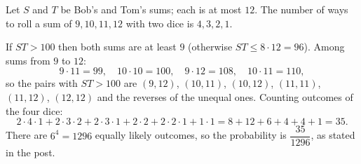 Let $S$ and $T$ be Bob's and Tom's sums; each is at most $12$. The number of ways to roll a sum of $9,10,11,12$ with two dice is $4,3,2,1$.

If $ST>100$ then both sums are at least $9$ (otherwise $ST\le8\cdot12=96$). Among sums from $9$ to $12$:
\[
9\cdot11=99,\quad 10\cdot10=100,\quad 9\cdot12=108,\quad 10\cdot11=110,
\]
so the pairs with $ST>100$ are $(9,12)$, $(10,11)$, $(10,12)$, $(11,11)$, $(11,12)$, $(12,12)$ and the reverses of the unequal ones. Counting outcomes of the four dice:
\[
2\cdot4\cdot1+2\cdot3\cdot2+2\cdot3\cdot1+2\cdot2+2\cdot2\cdot1+1\cdot1=8+12+6+4+4+1=35 .
\]
There are $6^4=1296$ equally likely outcomes, so the probability is $\boxed{\dfrac{35}{1296}}$, as stated in the post.
